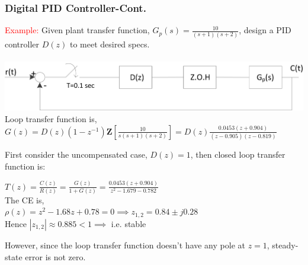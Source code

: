 \documentclass[mathserif, 10pt]{beamer} %
\def\Z{\mathbf{Z}}
\begin{document}
\frame
{

\small
\frametitle{Digital PID Controller-Cont.}
\textcolor{red}{Example:} Given plant transfer function, $G_p(s) = \frac{10}{(s+1)(s+2)}$,  design a PID controller $D(z)$ to meet desired specs. \\ \vspace{.15in} \\
\includegraphics[width=.75\linewidth]{./Figures/example_diag.png} \\
Loop transfer function is, \\ \vspace{.08in}
$G(z) = D(z)(1-z^{-1})\Z\left[ \frac{10}{s(s+1)(s+2)} \right] = D(z)\frac{0.0453(z+0.904)}{(z-0.905)(z-0.819)}$\\ \vspace{.08in}

First consider the uncompensated case, $D(z) = 1$, then closed loop transfer function is: \\ \vspace{.1in}

$T(z) = \frac{C(z)}{R(z)}=\frac{G(z)}{1+G(z)} = \frac{0.0453(z+0.904)}{z^2-1.679-0.782}$\\ \vspace{.07in}
The CE is, \\
$\rho(z) = z^2-1.68z+0.78 = 0 \implies z_{1,2} = 0.84 \pm j0.28$ \\ \vspace{.07in}
Hence $|z_{1,2}| \approx 0.885 < 1\implies$ i.e. stable \\ \vspace{.07in}

However, since the loop transfer function doesn't have any pole at $z=1$, steady-state error is not zero. \\


}
\end{document}
